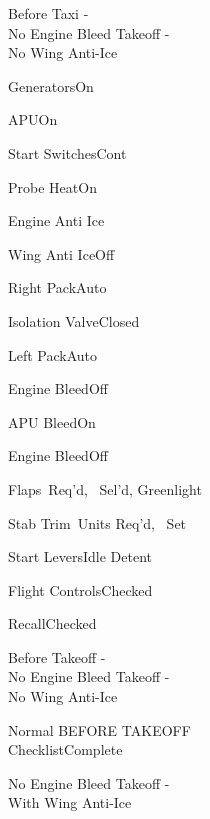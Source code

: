 \documentclass[sim-use]{checklist}
\begin{document}
\begin{checklist}{Before Taxi -\\No Engine Bleed Takeoff -\\No Wing Anti-Ice}
  \item{Generators}{On}
  \item{APU}{On}
  \item{Start Switches}{Cont}
  \item{Probe Heat}{On}
  \item{Engine Anti Ice}{\blank}
  \item{Wing Anti Ice}{Off}
  \item{Right Pack}{Auto}
  \item{Isolation Valve}{Closed}
  \item{Left Pack}{Auto}
  \item{Engine  Bleed}{Off}
  \item{APU Bleed}{On}
  \item{Engine  Bleed}{Off}
  \item{Flaps}{\blank\ Req'd, \blank\ Sel'd, Greenlight}
  \item{Stab Trim}{\blank\ Units Req'd, \blank\ Set}
  \item{Start Levers}{Idle Detent}
  \item{Flight Controls}{Checked}
  \item{Recall}{Checked}
\end{checklist}

\begin{checklist}{Before Takeoff -\\No Engine Bleed Takeoff -\\No Wing Anti-Ice}
  \item{Normal BEFORE TAKEOFF\\Checklist}{Complete}
\end{checklist}

\begin{checklist}{No Engine Bleed Takeoff -\\With Wing Anti-Ice}
\end{checklist}
\end{document}
